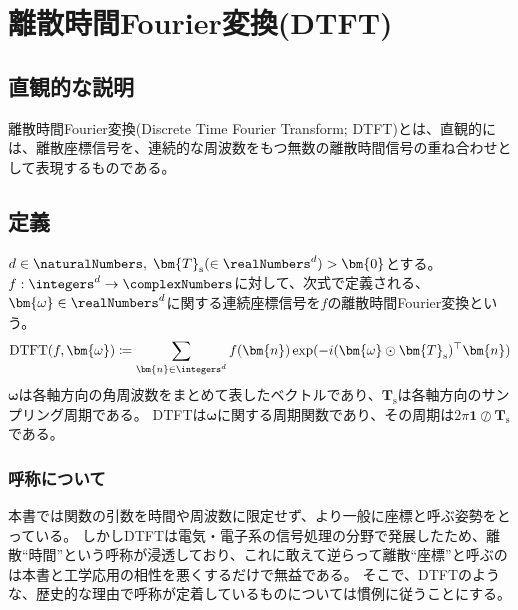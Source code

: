 		\chapter{離散時間Fourier変換(DTFT)}
			\section{直観的な説明}
				離散時間Fourier変換(Discrete Time Fourier Transform; DTFT)とは、直観的には、離散座標信号を、連続的な周波数をもつ無数の離散時間信号の重ね合わせとして表現するものである。
			\section{定義}
				$d\in\naturalNumbers,\;\bm{T}_\text{s}(\in\realNumbers^d)>\bm{0}$とする。
				$f:\integers^d\to\complexNumbers$に対して、次式で定義される、$\bm{\omega}\in\realNumbers^d$に関する連続座標信号を$f$の離散時間Fourier変換という。
				\[ \text{DTFT}(f,\bm{\omega}) \coloneqq \sum_{\bm{n}\in\integers^d} f(\bm{n})\exp(-i(\bm{\omega}\odot\bm{T}_\text{s})^\top\bm{n}) \]
				$\bm{\omega}$は各軸方向の角周波数をまとめて表したベクトルであり、$\bm{T}_\text{s}$は各軸方向のサンプリング周期である。
				DTFTは$\bm{\omega}$に関する周期関数であり、その周期は$2\pi\bm{1}\oslash\bm{T}_\text{s}$である。
				\subsection{呼称について}
					本書では関数の引数を時間や周波数に限定せず、より一般に座標と呼ぶ姿勢をとっている。
					しかしDTFTは電気・電子系の信号処理の分野で発展したため、離散``時間''という呼称が浸透しており、これに敢えて逆らって離散``座標''と呼ぶのは本書と工学応用の相性を悪くするだけで無益である。
					そこで、DTFTのような、歴史的な理由で呼称が定着しているものについては慣例に従うことにする。
